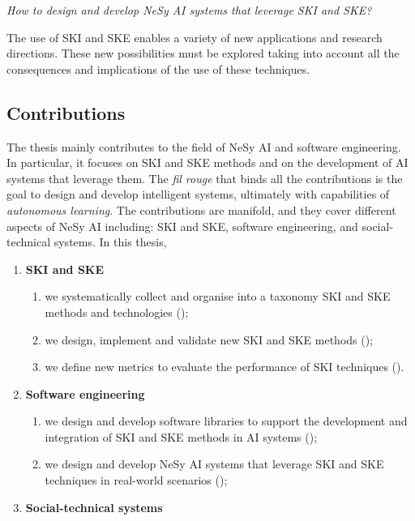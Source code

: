 \begin{refsection}
\begin{questions}
    \item \emph{How to design and develop \ac{NeSy} \ac{AI} systems that leverage \ac{SKI} and \ac{SKE}?}

    The use of \ac{SKI} and \ac{SKE} enables a variety of new applications and research directions.
    These new possibilities must be explored taking into account all the consequences and implications of the use of these techniques.
    \label{itm:rq4}
\end{questions}


\subsection*{Contributions}
%
The thesis mainly contributes to the field of \ac{NeSy} \ac{AI} and software engineering.
%
In particular, it focuses on \ac{SKI} and \ac{SKE} methods and on the development of \ac{AI} systems that leverage them.
%
The \textit{fil rouge} that binds all the contributions is the goal to design and develop intelligent systems, ultimately with capabilities of \emph{autonomous learning}.
%
The contributions are manifold, and they cover different aspects of \ac{NeSy} \ac{AI} including: \ac{SKI} and \ac{SKE}, software engineering, and social-technical systems.
%
In this thesis,
%
\begin{enumerate}[label=\emph{(\roman*)}]
    \item \textbf{\ac{SKI} and \ac{SKE}}

    \begin{enumerate}[label=\emph{(\arabic*)},resume]
        \item we systematically collect and organise into a taxonomy \ac{SKI} and \ac{SKE} methods and technologies ();
        \item we design, implement and validate new \ac{SKI} and \ac{SKE} methods ();
        \item we define new metrics to evaluate the performance of \ac{SKI} techniques ().
    \end{enumerate}
    \item \textbf{Software engineering}

    \begin{enumerate}[label=\emph{(\arabic*)},resume]
        \item we design and develop software libraries to support the development and integration of \ac{SKI} and \ac{SKE} methods in \ac{AI} systems ();
        \item we design and develop \ac{NeSy} \ac{AI} systems that leverage \ac{SKI} and \ac{SKE} techniques in real-world scenarios ();
    \end{enumerate}
    \item \textbf{Social-technical systems}


\end{enumerate}
\end{refsection}
